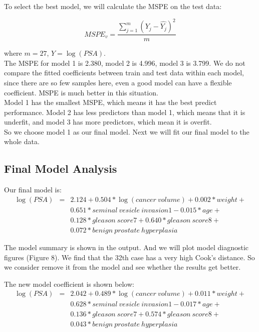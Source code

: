 \documentclass[12pt, letterpaper]{article}
\begin{document}
      To select the best model, we will calculate the MSPE on the test data:

      $$MSPE_v = \frac{\sum^{m}_{j=1}(Y_j - \hat{Y_j})^2}{m}$$

      where $m = 27$, $Y = \log(PSA)$.\\

      The MSPE for model 1 is 2.380, model 2 is 4.996, model 3 is 3.799. We do not compare the fitted coefficients between train and test data within each model, since there are so few samples here, even a good model can have a flexible coefficient. MSPE is much better in this situation.\\

      Model 1 has the smallest MSPE, which means it has the best predict performance. Model 2 has less predictors than model 1, which means that it is underfit, and model 3 has more predictors, which mean it is overfit.\\

      So we choose model 1 as our final model. Next we will fit our final model to the whole data.\\

  \subsection{Final Model Analysis}

    Our final model is:
    \begin{eqnarray}
      \log(PSA) &=& 2.124 + 0.504 * \log(cancer~volume) + 0.002 * weight + \nonumber\\
                 && 0.651 * seminal~vesicle~invasion1  -0.015 * age + \nonumber\\
                 && 0.128 * gleason~score7 + 0.640 * gleason~score8 + \nonumber\\
                 && 0.072 * benign~prostate~hyperplasia
    \end{eqnarray}

    The model summary is shown in the output. And we will plot model diagnostic figures (Figure 8). We find that the 32th case has a very high Cook's distance. So we consider remove it from the model and see whether the results get better.

    The new model coefficient is shown below:
    \begin{eqnarray}
      \log(PSA) &=& 2.042 + 0.489 * \log(cancer~volume) + 0.011 * weight + \nonumber\\
                 && 0.628 * seminal~vesicle~invasion1  -0.017 * age + \nonumber\\
                 && 0.136 * gleason~score7 + 0.574 * gleason~score8 + \nonumber\\
                 && 0.043 * benign~prostate~hyperplasia
    \end{eqnarray}
\end{document}
